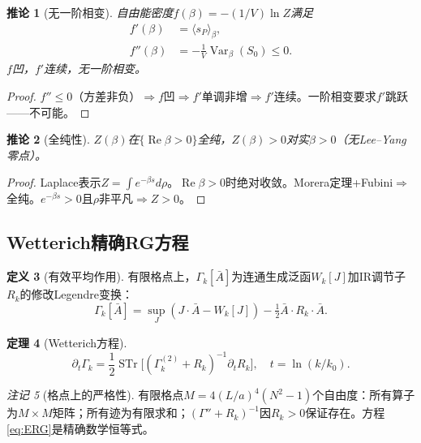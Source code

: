 \documentclass[12pt,a4paper]{article}
\theoremstyle{plain}
\newtheorem{theorem}{定理}[section]\newtheorem{lemma}[theorem]{引理}\newtheorem{corollary}[theorem]{推论}\newtheorem{proposition}[theorem]{命题}
\theoremstyle{definition}\newtheorem{definition}[theorem]{定义}
\theoremstyle{remark}\newtheorem{remark}[theorem]{注记}
\begin{document}
\begin{corollary}[无一阶相变]\label{cor:no1st}
自由能密度$f(\beta)=-(1/V)\ln Z$满足
\begin{align}
f'(\beta) &= \langle s_P\rangle_\beta, \label{eq:fprime}\\
f''(\beta) &= -\frac{1}{V}\operatorname{Var}_\beta(S_0) \leq 0. \label{eq:fdprime}
\end{align}
$f$凹，$f'$连续，无一阶相变。
\end{corollary}

\begin{proof}
$f''\leq 0$（方差非负）$\Rightarrow f$凹$\Rightarrow f'$单调非增$\Rightarrow f'$连续。一阶相变要求$f'$跳跃——不可能。
\end{proof}

\begin{corollary}[全纯性]\label{cor:holo}
$Z(\beta)$在$\{\operatorname{Re}\beta>0\}$全纯，$Z(\beta)>0$对实$\beta>0$（无Lee--Yang零点）。
\end{corollary}

\begin{proof}
Laplace表示$Z=\int e^{-\beta s}d\rho$。$\operatorname{Re}\beta>0$时绝对收敛。Morera定理+Fubini$\Rightarrow$全纯。$e^{-\beta s}>0$且$\rho$非平凡$\Rightarrow Z>0$。
\end{proof}

\subsection{Wetterich精确RG方程}\label{sec:ERG}

\begin{definition}[有效平均作用]\label{def:Gamma}
有限格点上，$\Gamma_k[\bar{A}]$为连通生成泛函$W_k[J]$加IR调节子$R_k$的修改Legendre变换：
\begin{equation}\label{eq:Gammadef}
\Gamma_k[\bar{A}] = \sup_J(J\cdot\bar{A} - W_k[J]) - \tfrac{1}{2}\bar{A}\cdot R_k\cdot\bar{A}.
\end{equation}
\end{definition}

\begin{theorem}[Wetterich方程\cite{Wetterich1993}]\label{thm:ERG}
\begin{equation}\label{eq:ERG}
\partial_t\Gamma_k = \frac{1}{2}\operatorname{STr}\!\Big[(\Gamma_k^{(2)}+R_k)^{-1}\partial_tR_k\Big], \quad t=\ln(k/k_0).
\end{equation}
\end{theorem}

\begin{remark}[格点上的严格性]\label{rem:rigorous}
有限格点$M=4(L/a)^4(N^2-1)$个自由度：所有算子为$M\times M$矩阵；所有迹为有限求和；$(\Gamma''+R_k)^{-1}$因$R_k>0$保证存在。方程\eqref{eq:ERG}是精确数学恒等式。
\end{remark}
\end{document}
